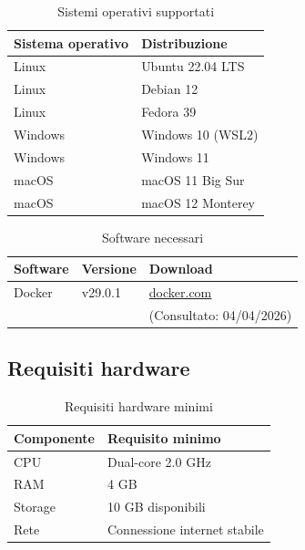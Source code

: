 \documentclass[a4paper,10pt]{article}
\begin{document}
\begin{table}[H]
\centering
\renewcommand{\arraystretch}{1.3}
\begin{tabular}{|l|l|}
\hline
\textbf{Sistema operativo} & \textbf{Distribuzione} \\ \hline

Linux & Ubuntu 22.04 LTS \\ 
Linux & Debian 12 \\ 
Linux & Fedora 39 \\ 

Windows & Windows 10 (WSL2) \\ 
Windows & Windows 11 \\ 

macOS & macOS 11 Big Sur \\ 
macOS & macOS 12 Monterey \\ \hline

\end{tabular}
\caption{Sistemi operativi supportati}
\end{table}

\begin{table}[H]
\centering
\renewcommand{\arraystretch}{1.3}
\begin{tabular}{|l|l|l|}
\hline
\textbf{Software} & \textbf{Versione} & \textbf{Download} \\ \hline

Docker & v29.0.1 & \href{https://www.docker.com}{docker.com} \\ 
& & \small (Consultato: 04/04/2026) \\ \hline

\end{tabular}
\caption{Software necessari}
\end{table}

\subsection{Requisiti hardware}
\begin{table}[H]
\centering
\renewcommand{\arraystretch}{1.3}
\begin{tabular}{|l|l|}
\hline
\textbf{Componente} & \textbf{Requisito minimo} \\ \hline

CPU & Dual-core 2.0 GHz \\ 
RAM & 4 GB \\ 
Storage & 10 GB disponibili \\ 
Rete & Connessione internet stabile \\ \hline

\end{tabular}
\caption{Requisiti hardware minimi}
\end{table}
\end{document}
